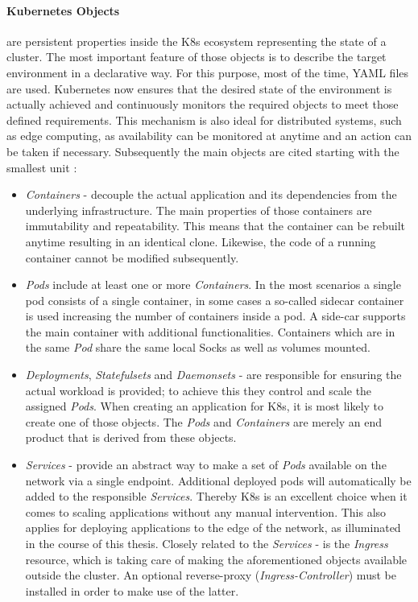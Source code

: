 \documentclass[MIC,Master,english]{twbook}%
\begin{document}
\paragraph{Kubernetes Objects} are persistent properties inside the \ac{K8s} ecosystem representing the state of a cluster. The most important feature of those objects is to describe the target environment in a declarative way. For this purpose, most of the time, YAML files are used. Kubernetes now ensures that the desired state of the environment is actually achieved and continuously monitors the required objects to meet those defined requirements. This mechanism is also ideal for distributed systems, such as edge computing, as availability can be monitored at anytime and an action can be taken if necessary. Subsequently the main objects are cited starting with the smallest unit \cite{k8sconc}:
\begin{itemize}
    \item \textit{Containers} - decouple the actual application and its dependencies from the underlying infrastructure. The main properties of those containers are immutability and repeatability. This means that the container can be rebuilt anytime resulting in an identical clone. Likewise, the code of a running container cannot be modified subsequently.
    \item \textit{Pods} include at least one or more \textit{Containers}. In the most scenarios a single pod consists of a single container, in some cases a so-called sidecar container is used increasing the number of containers inside a pod. A side-car supports the main container with additional functionalities. Containers which are in the same \textit{Pod} share the same local Socks as well as volumes mounted.
    \item \textit{Deployments}, \textit{Statefulsets} and \textit{Daemonsets} - are responsible for ensuring the actual workload is provided; to achieve this they control and scale the assigned \textit{Pods}. When creating an application for \ac{K8s}, it is most likely to create one of those objects. The \textit{Pods} and \textit{Containers} are merely an end product that is derived from these objects.
    \item \textit{Services} - provide an abstract way to make a set of \textit{Pods} available on the network via a single endpoint. Additional deployed pods will automatically be added to the responsible \textit{Services}. Thereby \ac{K8s} is an excellent choice when it comes to scaling applications without any manual intervention. This also applies for deploying applications to the edge of the network, as illuminated in the course of this thesis. Closely related to the \textit{Services} - is the \textit{Ingress} resource, which is taking care of making the aforementioned objects available outside the cluster. An optional reverse-proxy (\textit{Ingress-Controller}) must be installed in order to make use of the latter. \newline

\end{itemize}
\end{document}
